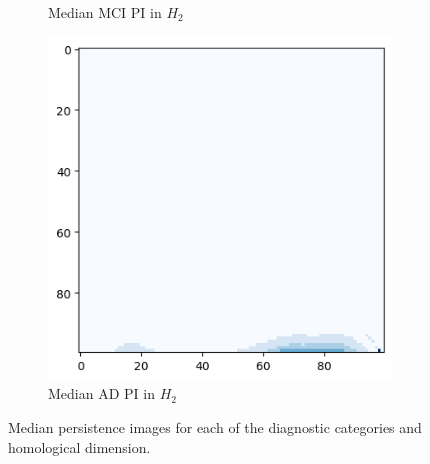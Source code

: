 \documentclass{article}
\begin{document}
\begin{figure}
\begin{subfigure}{0.32\textwidth}
    \caption{Median MCI PI in $H_2$}
  \end{subfigure}
  \begin{subfigure}{0.32\textwidth}
    \includegraphics[width=\textwidth]{figures/median_pls/median_pi_AD_h_2.png}
    \caption{Median AD PI in $H_2$}
  \end{subfigure}
  \caption{Median persistence images for each of the diagnostic categories and homological dimension.}
  \label{fig:median_pis}
\end{figure}
\end{document}
